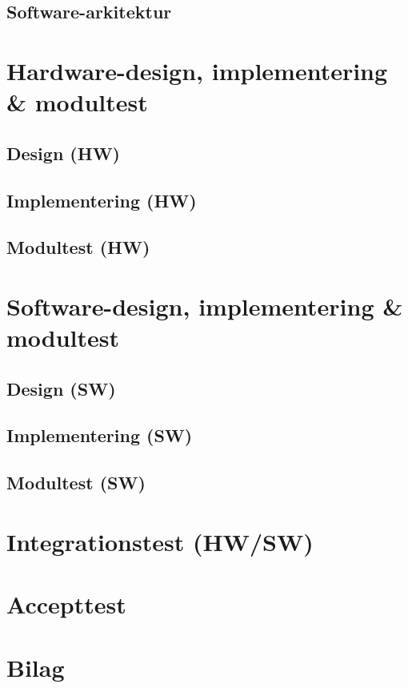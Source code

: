 \documentclass[11pt]{article}
\begin{document}
\subsection{Software-arkitektur}

\vfill
\pagebreak

\section{Hardware-design, implementering \& modultest}
\subsection{Design (HW)}
\subsection{Implementering (HW)}
\subsection{Modultest (HW)}
\vfill
\pagebreak

\section{Software-design, implementering \& modultest}
\subsection{Design (SW)}
\subsection{Implementering (SW)}
\subsection{Modultest (SW)}
\vfill
\pagebreak

\section{Integrationstest (HW/SW)}
\vfill
\pagebreak

\section{Accepttest}
\vfill
\pagebreak

\section{Bilag}
\vfill
\pagebreak
\end{document}
